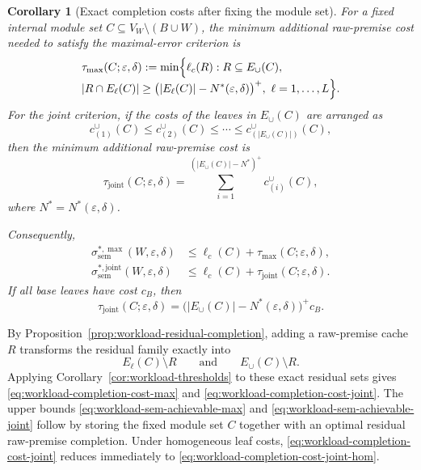 \documentclass[journal]{IEEEtran}
\makeatletter
\newtheorem{corollary}{Corollary}[section]
\numberwithin{equation}{section}
\renewenvironment{proof}[1][\proofname]{\par
  \pushQED{\qed}%
  \normalfont \topsep6\p@\@plus6\p@\relax
  \trivlist
  \item[\hskip\labelsep
        \itshape
    #1\@addpunct{.}]\ignorespaces
}{%
  \popQED\endtrivlist\@endpefalse
}
\makeatother
\begin{document}
\begin{corollary}[Exact completion costs after fixing the module set]
\label{cor:workload-completion-costs}
For a fixed internal module set \(C\subseteq V_W\setminus(B\cup W)\), the
minimum additional raw-premise cost needed to satisfy the maximal-error
criterion is
\begin{align}
  &\tau_{\max}(C;\varepsilon,\delta)
  :=
  \min\Bigl\{
    \ell_c(R):
    R\subseteq E_{\cup}(C),
    \nonumber\\[-1mm]
    &|R\cap E_\ell(C)|
      \ge
      \bigl(|E_\ell(C)|-N^*(\varepsilon,\delta)\bigr)^+,
      \ \ell=1,\ldots,L
  \Bigr\}.
\label{eq:workload-completion-cost-max}
\end{align}
For the joint criterion, if the costs of the leaves in \(E_{\cup}(C)\) are
arranged as
\[
  c_{(1)}^{\cup}(C)
  \le
  c_{(2)}^{\cup}(C)
  \le
  \cdots
  \le
  c_{(|E_{\cup}(C)|)}^{\cup}(C),
\]
then the minimum additional raw-premise cost is
\begin{equation}
  \tau_{\mathrm{joint}}(C;\varepsilon,\delta)
  =
  \sum_{i=1}^{(|E_{\cup}(C)|-N^*)^+}
  c_{(i)}^{\cup}(C),
\label{eq:workload-completion-cost-joint}
\end{equation}
where \(N^*=N^*(\varepsilon,\delta)\).

Consequently,
\begin{align}
  \sigma_{\mathrm{sem}}^{*,\max}(W,\varepsilon,\delta)
  &\le
  \ell_c(C)+\tau_{\max}(C;\varepsilon,\delta),
\label{eq:workload-sem-achievable-max}\\
  \sigma_{\mathrm{sem}}^{*,\mathrm{joint}}(W,\varepsilon,\delta)
  &\le
  \ell_c(C)+\tau_{\mathrm{joint}}(C;\varepsilon,\delta).
\label{eq:workload-sem-achievable-joint}
\end{align}
If all base leaves have cost \(c_B\), then
\begin{equation}
  \tau_{\mathrm{joint}}(C;\varepsilon,\delta)
  =
  \bigl(|E_{\cup}(C)|-N^*(\varepsilon,\delta)\bigr)^+c_B.
\label{eq:workload-completion-cost-joint-hom}
\end{equation}
\end{corollary}

\begin{proof}
By Proposition~\ref{prop:workload-residual-completion}, adding a raw-premise
cache \(R\) transforms the residual family exactly into
\[
  E_\ell(C)\setminus R
  \qquad\text{and}\qquad
  E_{\cup}(C)\setminus R.
\]
Applying Corollary~\ref{cor:workload-thresholds} to these exact residual sets
gives \eqref{eq:workload-completion-cost-max} and
\eqref{eq:workload-completion-cost-joint}.  The upper bounds
\eqref{eq:workload-sem-achievable-max} and
\eqref{eq:workload-sem-achievable-joint} follow by storing the fixed module set
\(C\) together with an optimal residual raw-premise completion.  Under
homogeneous leaf costs, \eqref{eq:workload-completion-cost-joint} reduces
immediately to \eqref{eq:workload-completion-cost-joint-hom}.
\end{proof}
\end{document}
